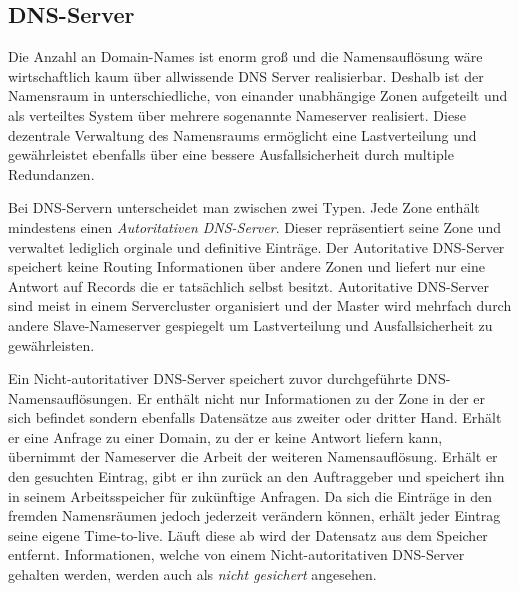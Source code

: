 \subsection{DNS-Server}
Die Anzahl an Domain-Names ist enorm groß und die Namensauflösung wäre wirtschaftlich kaum über allwissende DNS Server realisierbar. Deshalb ist der Namensraum in unterschiedliche, von einander unabhängige Zonen aufgeteilt und als verteiltes System über mehrere sogenannte Nameserver realisiert. Diese dezentrale Verwaltung des Namensraums ermöglicht eine Lastverteilung und gewährleistet ebenfalls über eine bessere Ausfallsicherheit durch multiple Redundanzen. 

Bei DNS-Servern unterscheidet man zwischen zwei Typen. Jede Zone enthält mindestens einen \textit{Autoritativen DNS-Server}. Dieser repräsentiert seine Zone und verwaltet lediglich orginale und definitive Einträge. Der Autoritative DNS-Server speichert keine Routing Informationen über andere Zonen und liefert nur eine Antwort auf Records die er tatsächlich selbst besitzt. Autoritative DNS-Server sind meist in einem Servercluster organisiert und der Master wird mehrfach durch andere Slave-Nameserver gespiegelt um Lastverteilung und Ausfallsicherheit zu gewährleisten. 

Ein Nicht-autoritativer DNS-Server speichert zuvor durchgeführte DNS-Namensauflösungen. Er enthält nicht nur Informationen zu der Zone in der er sich befindet sondern ebenfalls Datensätze aus zweiter oder dritter Hand. Erhält er eine Anfrage zu einer Domain, zu der er keine Antwort liefern kann, übernimmt der Nameserver die Arbeit der weiteren Namensauflösung. Erhält er den gesuchten Eintrag, gibt er ihn zurück an den Auftraggeber und speichert ihn in seinem Arbeitsspeicher für zukünftige Anfragen. Da sich die Einträge in den fremden Namensräumen jedoch jederzeit verändern können, erhält jeder Eintrag seine eigene Time-to-live. Läuft diese ab wird der Datensatz aus dem Speicher entfernt.  Informationen, welche von einem Nicht-autoritativen DNS-Server gehalten werden, werden auch als \textit{nicht gesichert} angesehen. \cite{1und1.2018}

